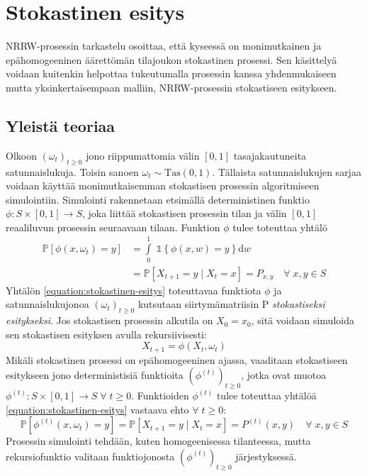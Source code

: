 \documentclass[finnish, 12pt, a4paper, sci, utf8, pdfa]{aaltothesis}
\newcommand{\indicator}{\mathopen{\mathds{1}}}
\newcommand*{\prob}{\mathbb{P}}
\begin{document}
\section{Stokastinen esitys}

NRRW-prosessin tarkastelu osoittaa, että kyseessä on monimutkainen ja epähomogeeninen äärettömän tilajoukon stokastinen prosessi. Sen käsittelyä voidaan kuitenkin helpottaa tukeutumalla
prosessin kanssa yhdenmukaiseen mutta yksinkertaisempaan malliin, NRRW-prosessin stokastiseen esitykseen.

\subsection{Yleistä teoriaa}

Olkoon \( (\omega_{t})_{t \geq 0} \) jono riippumattomia välin \( [0, 1] \) tasajakautuneita satunnaislukuja. Toisin sanoen \( \omega_{t} \sim \text{Tas}(0, 1) \). Tällaista satunnaislukujen sarjaa voidaan käyttää monimutkaisemman stokastisen prosessin algoritmiseen simulointiin. Simulointi rakennetaan etsimällä deterministinen funktio \( \phi : S \times [0, 1] \to S \), joka liittää stokastisen prosessin tilan ja välin \( [0, 1] \) reaaliluvun prosessin seuraavaan tilaan. Funktion \( \phi \) tulee toteuttaa yhtälö
\begin{equation}
   \begin{aligned}
   \prob \left[ \phi(x, \omega_{t}) = y \right] &= \int\limits_0^1 \; \indicator \left\{ \phi(x, w) = y \right\} \mathrm{d}w \\
                                                &= \prob \left[ X_{t+1} = y \mid X_{t} = x \right] = P_{x,y} \quad \forall \; x, y \in S
   \end{aligned}
   \label{equation:stokastinen-esitys}
\end{equation}
Yhtälön \ref{equation:stokastinen-esitys} toteuttavaa funktiota \( \phi \) ja satunnaislukujonoa \( (\omega_{t})_{t \geq 0} \) kutsutaan siirtymämatriisin P \textit{stokastiseksi esitykseksi}. Jos stokastisen prosessin alkutila on \( X_{0} = x_{0} \), sitä voidaan simuloida sen stokastisen esityksen avulla rekursiivisesti:
\[
   X_{t+1} = \phi(X_{t}, \omega_{t})
\]
Mikäli stokastinen prosessi on epähomogeeninen ajassa, vaaditaan stokastiseen esitykseen jono deterministisiä funktioita \( (\phi^{(t)})_{t \geq 0} \), jotka ovat muotoa \( \phi^{(t)} : S \times [0, 1] \to S \; \forall \; t \geq 0 \). Funktioiden \( \phi^{(t)} \) tulee toteuttaa yhtälöä \ref{equation:stokastinen-esitys} vastaava ehto \( \forall \; t \geq 0 \):
\begin{equation}
   \prob \left[ \phi^{(t)}(x, \omega_{t}) = y \right] = \prob \left[ X_{t+1} = y \mid X_{t} = x \right] = P^{(t)}(x,y) \quad \forall \; x, y \in S
   \label{equation:epahom-stokastinen-esitys}
\end{equation}
Prosessin simulointi tehdään, kuten homogeenisessa tilanteessa, mutta rekursiofunktio valitaan funktiojonosta \( (\phi^{(t)})_{t \geq 0} \) järjestyksessä. \cite{Haggstrom}
\end{document}
